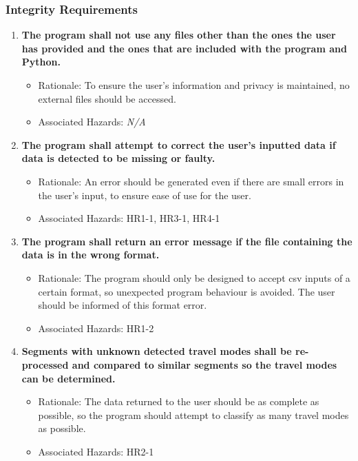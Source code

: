 \documentclass{article}
\begin{document}
\subsubsection{Integrity Requirements}
\begin{enumerate}[{IR}1. ]
\item \label{IR1} \textbf{The program shall not use any files other than the ones the user has provided and the ones that are included with the program and Python.}
    \begin{itemize} 
        \item Rationale: To ensure the user's information and privacy is maintained, no external files should be accessed.
         \item Associated Hazards: \textit{N/A}
    \end{itemize}
\item \label{IR2} \textbf{The program shall attempt to correct the user's inputted data if data is detected to be missing or faulty.}
    \begin{itemize} 
        \item Rationale: An error should be generated even if there are small errors in the user's input, to ensure ease of use for the user.
         \item Associated Hazards: HR1-1, HR3-1, HR4-1
    \end{itemize} 
\item \label{IR3} \textbf{The program shall return an error message if the file containing the data is in the wrong format.}
    \begin{itemize} 
        \item Rationale: The program should only be designed to accept csv inputs of a certain format, so unexpected program behaviour is avoided. The user should be informed of this format error.
         \item Associated Hazards: HR1-2
    \end{itemize} 
\item \label{IR4} \textbf{Segments with unknown detected travel modes shall be re-processed and compared to similar segments so the travel modes can be determined.}
    \begin{itemize} 
        \item Rationale: The data returned to the user should be as complete as possible, so the program should attempt to classify as many travel modes as possible.
         \item Associated Hazards: HR2-1
    \end{itemize} 

\end{enumerate}
\end{document}
